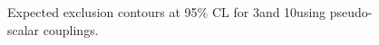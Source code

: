 \begin{figure}[h]
  \centering
  \caption{\label{fig:limits_A} Expected exclusion contours at 95\% CL for 3\fbinv and 10\fbinv using pseudo-scalar couplings. }
\end{figure}


